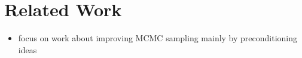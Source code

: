 \section{Related Work}\label{chap:related_work}

\begin{itemize}
    \item focus on work about improving MCMC sampling mainly by preconditioning ideas
\end{itemize}


\newpage
